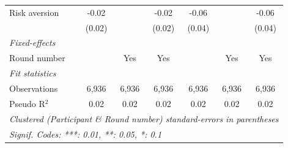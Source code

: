 \begin{tabular}{lcccccc}
   Risk aversion      & -0.02        &              & -0.02       & -0.06       &              & -0.06\\   
                      & (0.02)       &              & (0.02)      & (0.04)      &              & (0.04)\\   
   \midrule
   \emph{Fixed-effects}\\
   Round number       &              & Yes          & Yes         &             & Yes          & Yes\\  
   \midrule
   \emph{Fit statistics}\\
   Observations       & 6,936        & 6,936        & 6,936       & 6,936       & 6,936        & 6,936\\  
   Pseudo R$^2$       & 0.02         & 0.02         & 0.02        & 0.02        & 0.02         & 0.02\\  
   \midrule \midrule
   \multicolumn{7}{l}{\emph{Clustered (Participant \& Round number) standard-errors in parentheses}}\\
   \multicolumn{7}{l}{\emph{Signif. Codes: ***: 0.01, **: 0.05, *: 0.1}}\\
\end{tabular}
\par\endgroup

